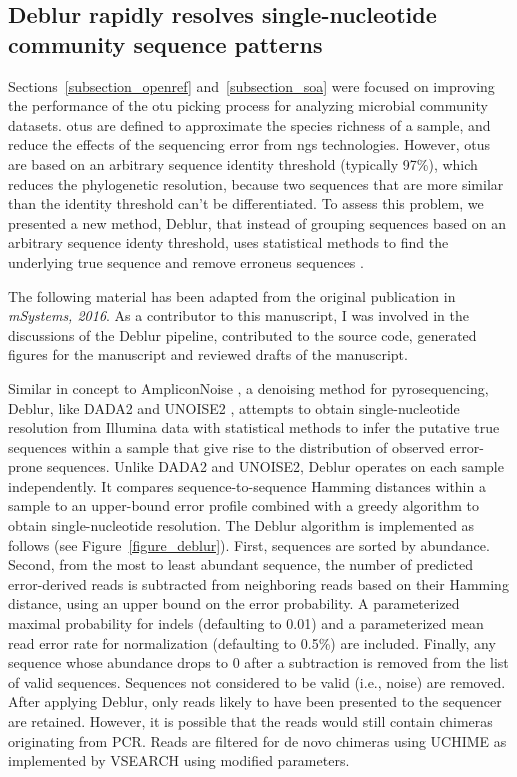 \subsection{Deblur rapidly resolves single-nucleotide community sequence patterns}\label{subsection_deblur}

Sections~\ref{subsection_openref} and~\ref{subsection_soa} were focused on
improving the performance of the \gls{otu} picking process for analyzing
microbial community datasets. \gls{otu}s are defined to approximate the species
richness of a sample, and reduce the effects of the sequencing error from \gls{ngs}
technologies. However, \gls{otu}s are based on an arbitrary sequence identity
threshold (typically 97\%), which reduces the phylogenetic resolution, because two
sequences that are more similar than the identity threshold can't be differentiated.
To assess this problem, we presented a new method, Deblur, that instead of grouping
sequences based on an arbitrary sequence identy threshold, uses statistical
methods to find the underlying true sequence and remove erroneus sequences \cite{Amir2017}.

The following material has been adapted from the original publication in
\textsl{mSystems, 2016}. As a contributor to this manuscript, I was involved in
the discussions of the Deblur pipeline, contributed to the source code, generated
figures for the manuscript and reviewed drafts of the manuscript.

Similar in concept to AmpliconNoise \cite{Quince2011}, a denoising method for
pyrosequencing, Deblur, like DADA2 \cite{Callahan2016} and UNOISE2 \cite{Edgar2016},
attempts to obtain single-nucleotide resolution from Illumina data with
statistical methods to infer the putative true sequences within a sample that
give rise to the distribution of observed error-prone sequences. Unlike DADA2 and
UNOISE2, Deblur operates on each sample independently. It compares
sequence-to-sequence Hamming distances within a sample to an upper-bound error
profile combined with a greedy algorithm to obtain single-nucleotide resolution.
The Deblur algorithm is implemented as follows (see Figure~\ref{figure_deblur}).
First, sequences are sorted by abundance. Second, from the most to least
abundant sequence, the number of predicted error-derived reads is subtracted
from neighboring reads based on their Hamming distance, using an upper bound on
the error probability. A parameterized maximal probability for indels
(defaulting to 0.01) and a parameterized mean read error rate for normalization
(defaulting to 0.5\%) are included. Finally, any sequence whose abundance drops
to 0 after a subtraction is removed from the list of valid sequences. Sequences
not considered to be valid (i.e., noise) are removed. After applying Deblur,
only reads likely to have been presented to the sequencer are retained.
However, it is possible that the reads would still contain chimeras originating
from PCR. Reads are filtered for de novo chimeras using UCHIME \cite{Edgar2011}
as implemented by VSEARCH \cite{Rognes2016} using modified parameters.

